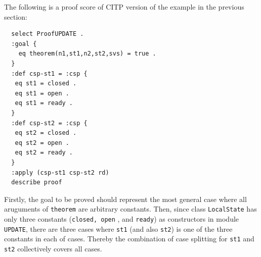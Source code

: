 \documentclass[12pt]{report}
\begin{document}
The following is a proof score of CITP version of the example in the previous section:
\small
\begin{verbatim}
  select ProofUPDATE .
  :goal {
    eq theorem(n1,st1,n2,st2,svs) = true .
  }
  :def csp-st1 = :csp {
   eq st1 = closed .
   eq st1 = open .
   eq st1 = ready .
  }
  :def csp-st2 = :csp {
   eq st2 = closed .
   eq st2 = open .
   eq st2 = ready .
  }
  :apply (csp-st1 csp-st2 rd)
  describe proof
\end{verbatim}
\normalsize
Firstly, the goal to be proved should represent the most general case
where all aruguments of {\tt theorem} are arbitrary constants.
Then, since class {\tt LocalState} has only
three constants ({\tt closed, open} , and {\tt ready}) as constructors
in module {\tt UPDATE}, there are three cases where {\tt st1} (and
also {\tt st2}) is one of the three constants in each of cases. Thereby
the combination of case splitting for {\tt st1} and {\tt st2}
collectively covers all cases.
\end{document}
